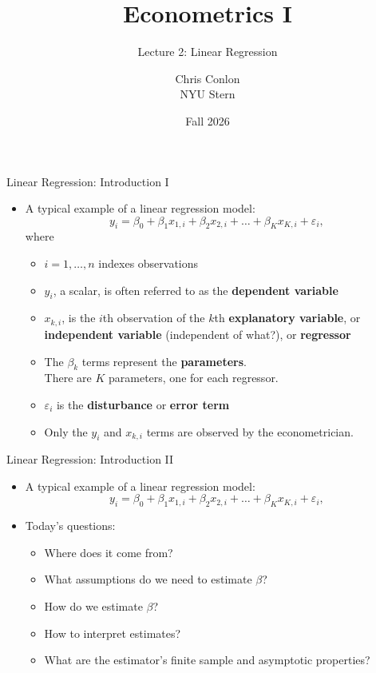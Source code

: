 \documentclass[aspectratio=169,11pt]{beamer}
\title[L3 - Linear Regression]{ Econometrics I}
\subtitle{Lecture 2: Linear Regression}
\author{Chris Conlon \\NYU Stern}
\date{Fall 2026}
\begin{document}
\maketitle



\begin{frame}{Linear Regression: Introduction I}
\begin{itemize}
	\item A typical example of a linear regression model:
	\begin{equation*}
		y_i = \beta_0 + \beta_1 x_{1,i} +  \beta_2 x_{2,i} + \dots +  \beta_K x_{K,i} + \varepsilon_i,
	\end{equation*}
	where 
	\begin{itemize}
		\item<1-> $i=1,\dots,n$ indexes observations
		\smallskip
		\item<2-> $y_{i}$, a scalar, is often referred to as the {\bf dependent variable}
		\smallskip
		\item<3-> $x_{k,i}$, is the $i$th observation of the $k$th {\bf explanatory variable},
		 or {\bf independent variable} (independent of what?), or  {\bf regressor}
		\smallskip
		\item<4-> The $\beta_{k}$ terms represent the {\bf  parameters}. \\
		There are $K$ parameters, one	for each regressor.

		\smallskip
		\item<5-> $\varepsilon_{i}$ is the {\bf disturbance} or {\bf error term}
\smallskip
		\item<6-> Only the $y_{i}$ and $x_{k,i}$ terms are observed by the econometrician.
	\end{itemize}
\end{itemize}
\end{frame}


\begin{frame}{Linear Regression: Introduction II}
\begin{itemize}
	\item A typical example of a linear regression model:
	\begin{equation*}
		y_i = \beta_0 + \beta_1 x_{1,i} +  \beta_2 x_{2,i} + \dots +  \beta_K x_{K,i} + \varepsilon_i,
	\end{equation*}
	\item Today's questions: 
	\begin{itemize}
		\item Where does it come from? 
		\item What assumptions do we need to estimate $\beta$?
		\item How do we estimate $\beta$?
		\item How to interpret estimates? 
		\item What are the estimator's finite sample and asymptotic properties? 
	\end{itemize}
\end{itemize}
\end{frame}
\end{document}
